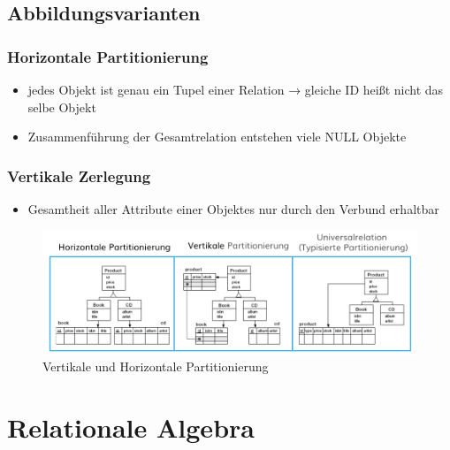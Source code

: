 \documentclass[a4paper]{article}
\begin{document}
\subsection{Abbildungsvarianten}
\subsubsection{Horizontale Partitionierung}
\begin{itemize}
    \item jedes Objekt ist genau ein Tupel einer Relation → gleiche ID heißt nicht das selbe Objekt
    \item Zusammenführung der Gesamtrelation entstehen viele NULL Objekte
\end{itemize}

\subsubsection{Vertikale Zerlegung}
\begin{itemize}
    \item Gesamtheit aller Attribute einer Objektes nur durch den Verbund erhaltbar
\end{itemize}

\begin{figure}[htp]
    \centering
    \includegraphics[width=14cm]{images/Partitionierung.png}
    \caption{Vertikale und Horizontale Partitionierung}
    \label{fig:Partitionierung}
\end{figure}

\newpage

\section{Relationale Algebra}
\end{document}
